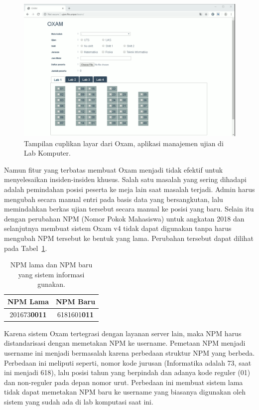 \begin{figure}
    \centering
    \includegraphics[width=0.7\paperwidth]{Gambar/ss-oxam.png}
    \caption{Tampilan cuplikan layar dari Oxam, aplikasi manajemen ujian di Lab Komputer.}
    \label{fig:ss-Oxam}
\end{figure}

Namun fitur yang terbatas membuat Oxam menjadi tidak efektif untuk menyelesaikan
insiden-insiden khusus. Salah satu masalah yang sering dihadapi adalah
pemindahan posisi peserta ke meja lain saat masalah terjadi. Admin harus
mengubah secara manual entri pada basis data yang bersangkutan, lalu memindahkan
berkas ujian tersebut secara manual ke posisi yang baru. Selain itu dengan
perubahan NPM (Nomor Pokok Mahasiswa) untuk angkatan 2018 dan selanjutnya
membuat sistem Oxam v4 tidak dapat digunakan tanpa harus mengubah NPM
tersebut ke bentuk yang lama. Perubahan tersebut dapat dilihat pada Tabel~\ref{tab:table-npm}. 

\begin{table}[H]
    \centering
    \caption{NPM lama dan NPM baru yang sistem informasi gunakan.}
    \label{tab:table-npm}
    \def\arraystretch{2}
    \begin{tabular}{|c|c|}
        \hline
        \textbf{NPM Lama} & \textbf{NPM Baru} \\
        \hline
        201673\textbf{0011} & 6181601\textbf{011} \\
        \hline
    \end{tabular}
\end{table}

Karena sistem Oxam tertegrasi dengan layanan server lain, maka NPM harus
distandarisasi dengan memetakan NPM ke username. Pemetaan NPM menjadi username
ini menjadi bermasalah karena perbedaan struktur NPM yang berbeda. Perbedaan ini
meliputi seperti, nomor kode jurusan (Informatika adalah 73, saat ini menjadi
618), lalu posisi tahun yang berpindah dan adanya kode reguler (01) dan
non-reguler pada depan nomor urut. Perbedaan ini membuat sistem lama tidak dapat
memetakan NPM baru ke username yang biasanya digunakan oleh sistem yang sudah
ada di lab komputasi saat ini.


